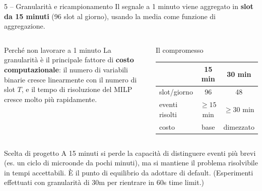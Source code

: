 \documentclass[aspectratio=169]{beamer}
\begin{document}
\begin{frame}{5 -- Granularit\`a e ricampionamento}
  Il segnale a 1 minuto viene aggregato in \textbf{slot da 15 minuti} (96 slot al giorno),
  usando la media come funzione di aggregazione.

  \vspace{0.5em}
  \begin{columns}[T]
    \begin{block}{Perch\'e non lavorare a 1 minuto}
      \small
      La granularit\`a \`e il principale fattore di \textbf{costo computazionale}: il numero di
      variabili binarie cresce linearmente con il numero di slot $T$, e il tempo di risoluzione del
      MILP cresce molto pi\`u rapidamente.
    \end{block}
    \begin{block}{Il compromesso}
      \small
      \begin{tabular}{@{}l c c@{}}
        \toprule
        & 15 min & 30 min \\
        \midrule
        slot/giorno & 96 & 48 \\
        eventi risolti & $\ge 15$ min & $\ge 30$ min \\
        costo & base & dimezzato \\
        \bottomrule
      \end{tabular}
    \end{block}
  \end{columns}

  \vspace{0.5em}
  \begin{alertblock}{Scelta di progetto}
    \small
    A 15 minuti si perde la capacit\`a di distinguere eventi pi\`u brevi (es. un ciclo di microonde
    da pochi minuti), ma si mantiene il problema risolvibile in tempi accettabili. \`E il punto di
    equilibrio da adottare di default. (Esperimenti effettuati con granularità di 30m per rientrare in 60s time limit.)
  \end{alertblock}
\end{frame}
\end{document}
